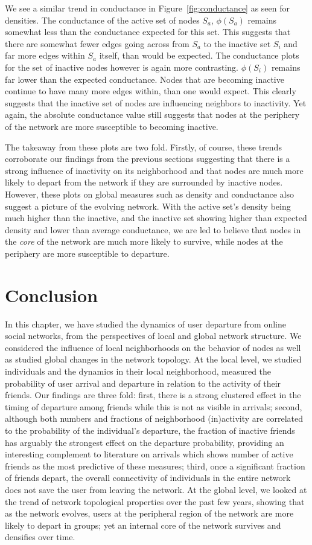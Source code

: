 \documentclass[phd,tocprelim]{cornell}
\begin{document}
We see a similar trend in conductance in Figure~\ref{fig:conductance} as seen for densities. The conductance of the active set of nodes $S_a$, $\phi(S_a)$ remains somewhat less than the conductance expected for this set. This suggests that there are somewhat fewer edges going across from $S_a$ to the inactive set $S_i$ and far more edges within $S_a$ itself, than would be expected. The conductance plots for the set of inactive nodes however is again more contrasting. $\phi(S_i)$ remains far lower than the expected conductance. Nodes that are becoming inactive continue to have many more edges within, than one would expect. This clearly suggests that the inactive set of nodes are influencing neighbors to inactivity. Yet again, the absolute conductance value still suggests that nodes at the periphery of the network are more susceptible to becoming inactive. 

The takeaway from these plots are two fold. Firstly, of course, these trends
corroborate our findings from the previous sections suggesting that there is a
strong influence of inactivity on its neighborhood and that nodes are much more
likely to depart from the network if they are surrounded by inactive
nodes. However, these plots on global measures such as density and conductance
also suggest a picture of the evolving network. With the active set's density
being much higher than the inactive, and the inactive set showing higher than
expected density and lower than average conductance, we are led to believe that
nodes in the {\em core} of the network are much more likely to survive, while
nodes at the periphery are more susceptible to departure.

\section{Conclusion}
In this chapter, we have studied the dynamics of user departure from
online social networks, from the perspectives of local and global network structure. 
We considered the influence of local
neighborhoods on the behavior of nodes as well as studied global
changes in the network topology. At the local level, we studied
individuals and the dynamics in their local neighborhood, measured the
probability of user arrival and departure in relation to the
activity of their friends. Our findings are three fold: first, there
is a strong clustered effect in the timing of departure among friends
while this is not as visible in arrivals; second, although both
numbers and fractions of neighborhood (in)activity are correlated to
the probability of the individual's departure, the fraction of
inactive friends has arguably the strongest effect on the departure
probability, providing an interesting complement to literature on arrivals which
shows number of active friends as the most predictive of these
measures; third, once a significant fraction of friends depart, the
overall connectivity of individuals in the entire network does not
save the user from leaving the network. At the global level, we looked
at the trend of network topological properties over the past few
years, showing that as the network evolves, users at the peripheral
region of the network are more likely to depart in groups; yet an internal core
of the network survives and densifies over time. 
\end{document}
